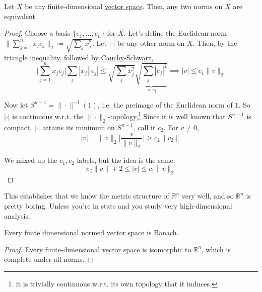   \begin{theorem}
    \label{thm:all-norms-on-a-finite-dimensional-space-are}
    Let $X$ be any finite-dimensional \hyperref[lin-def:vector-space]{vector space}. Then, any two norms on $X$ are equivalent. 
  \end{theorem}
  \begin{proof}
    Choose a basis $\{e_1, \ldots, e_n\}$ for $X$. Let's define the Euclidean norm $\| \sum_{j=1}^n x_j e_j\|_2 \coloneqq \sqrt{\sum_j x_j^2}$. Let $|\cdot|$ be any other norm on $X$. Then, by the triangle inequality, followed by \hyperref[lin-thm:cauchy-schwarz]{Cauchy-Schwarz}, 
    \begin{equation}
      \bigg| \sum_{j=1}^n x_j e_j \bigg| \sum_j |x_j| |e_j|  \leq \sqrt{\sum_j x_j^2} \underbrace{\sqrt{\sum_j |e_j|^2}}_{= c_1} \implies |v| \leq c_1 \|v\|_2
    \end{equation}

    Now let $S^{n-1} = \|\cdot\|^{-1} (1)$, i.e. the preimage of the Euclidean norm of $1$. So $| \cdot |$ is continuous w.r.t. the $\|\cdot\|_2$-topology,\footnote{it is trivially continuous w.r.t. its own topology that it induces.} Since it is well known that $S^{n-1}$ is compact, $|\cdot|$ attains its minimum on $S^{n-1}$, call it $c_2$. For $v \neq 0$, 
    \begin{equation}
      |v| = \|v\|_2 \bigg| \frac{v}{\|v\|_2} \bigg| \geq c_2 \|v_2\|
    \end{equation}

    We mixed up the $c_1, c_2$ labels, but the idea is the same. 
    \begin{equation}
      c_2 \|v\|+2 \leq |v| \leq c_1 \|v\|_2 
    \end{equation}
  \end{proof}

  This establishes that we know the metric structure of $\mathbb{R}^n$ very well, and so $\mathbb{R}^n$ is pretty boring. Unless you're in stats and you study very high-dimensional analysis. 

  \begin{corollary}[1.2.6]
    \label{thm:1-2-6}
    Every finite dimensional normed \hyperref[lin-def:vector-space]{vector space} is Banach. 
  \end{corollary}
  \begin{proof}
    Every finite-dimensional \hyperref[lin-def:vector-space]{vector space} is isomorphic to $\mathbb{R}^n$, which is complete under all norms. 
  \end{proof}

